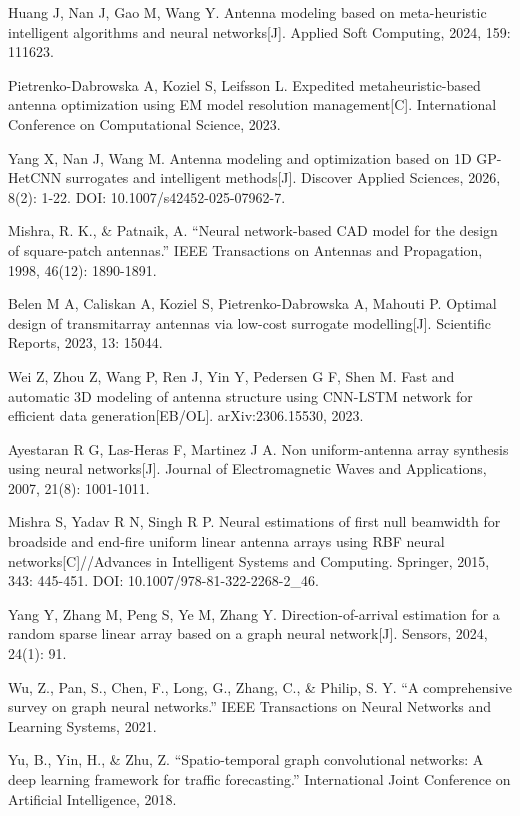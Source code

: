 \documentclass[UTF8,a4paper,12pt]{ctexart}
\begin{document}
\begin{enumerate}[label={\textnormal{[\arabic*]}},leftmargin=2.8em,itemsep=0.35em]
\item Huang J, Nan J, Gao M, Wang Y. Antenna modeling based on meta-heuristic intelligent algorithms and neural networks[J]. Applied Soft Computing, 2024, 159: 111623.
\item Pietrenko-Dabrowska A, Koziel S, Leifsson L. Expedited metaheuristic-based antenna optimization using EM model resolution management[C]. International Conference on Computational Science, 2023.
\item Yang X, Nan J, Wang M. Antenna modeling and optimization based on 1D GP-HetCNN surrogates and intelligent methods[J]. Discover Applied Sciences, 2026, 8(2): 1-22. DOI: 10.1007/s42452-025-07962-7.
\item Mishra, R. K., \& Patnaik, A. “Neural network-based CAD model for the design of square-patch antennas.” IEEE Transactions on Antennas and Propagation, 1998, 46(12): 1890-1891.
\item Belen M A, Caliskan A, Koziel S, Pietrenko-Dabrowska A, Mahouti P. Optimal design of transmitarray antennas via low-cost surrogate modelling[J]. Scientific Reports, 2023, 13: 15044.
\item Wei Z, Zhou Z, Wang P, Ren J, Yin Y, Pedersen G F, Shen M. Fast and automatic 3D modeling of antenna structure using CNN-LSTM network for efficient data generation[EB/OL]. arXiv:2306.15530, 2023.
\item Ayestaran R G, Las-Heras F, Martinez J A. Non uniform-antenna array synthesis using neural networks[J]. Journal of Electromagnetic Waves and Applications, 2007, 21(8): 1001-1011.
\item Mishra S, Yadav R N, Singh R P. Neural estimations of first null beamwidth for broadside and end-fire uniform linear antenna arrays using RBF neural networks[C]//Advances in Intelligent Systems and Computing. Springer, 2015, 343: 445-451. DOI: 10.1007/978-81-322-2268-2\_46.
\item Yang Y, Zhang M, Peng S, Ye M, Zhang Y. Direction-of-arrival estimation for a random sparse linear array based on a graph neural network[J]. Sensors, 2024, 24(1): 91.
\item Wu, Z., Pan, S., Chen, F., Long, G., Zhang, C., \& Philip, S. Y. “A comprehensive survey on graph neural networks.” IEEE Transactions on Neural Networks and Learning Systems, 2021.
\item Yu, B., Yin, H., \& Zhu, Z. “Spatio-temporal graph convolutional networks: A deep learning framework for traffic forecasting.” International Joint Conference on Artificial Intelligence, 2018.

\end{enumerate}
\end{document}
